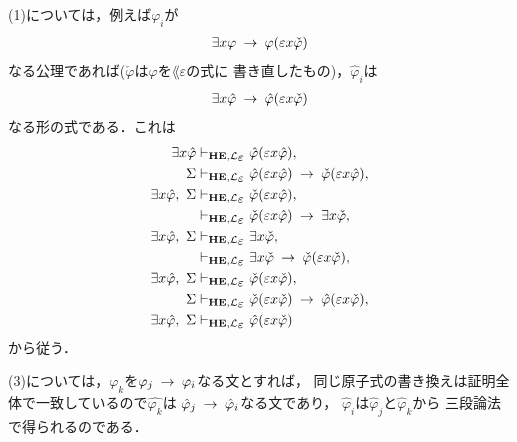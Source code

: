\begin{metaprf}
		(1)については，例えば$\varphi_{i}$が
		\begin{align}
			\exists x \varphi \hspace{0.25em}\rightarrow\hspace{0.25em} \varphi(\varepsilon x \check{\varphi})
		\end{align}
		なる公理であれば($\check{\varphi}$は$\varphi$を$\lang{\varepsilon}$の式に
		書き直したもの)，$\hat{\varphi}_{i}$は
		\begin{align}
			\exists x \hat{\varphi} \hspace{0.25em}\rightarrow\hspace{0.25em} \hat{\varphi}(\varepsilon x \check{\varphi})
		\end{align}
		なる形の式である．これは
		\begin{align}
			\exists x \hat{\varphi} &\provable{\mbox{{\bf HE}},\lang{\varepsilon}} \hat{\varphi}(\varepsilon x \hat{\varphi}), \\
			\Sigma &\provable{\mbox{{\bf HE}},\lang{\varepsilon}} \hat{\varphi}(\varepsilon x \hat{\varphi}) \rarrow \check{\varphi}(\varepsilon x \hat{\varphi}), \\
			\exists x \hat{\varphi},\ \Sigma &\provable{\mbox{{\bf HE}},\lang{\varepsilon}} \check{\varphi}(\varepsilon x \hat{\varphi}), \\
			&\provable{\mbox{{\bf HE}},\lang{\varepsilon}} \check{\varphi}(\varepsilon x \hat{\varphi}) \rarrow \exists x \check{\varphi}, \\
			\exists x \hat{\varphi},\ \Sigma &\provable{\mbox{{\bf HE}},\lang{\varepsilon}} \exists x \check{\varphi}, \\
			&\provable{\mbox{{\bf HE}},\lang{\varepsilon}} \exists x \check{\varphi} \rarrow \check{\varphi}(\varepsilon x \check{\varphi}), \\
			\exists x \hat{\varphi},\ \Sigma &\provable{\mbox{{\bf HE}},\lang{\varepsilon}} \check{\varphi}(\varepsilon x \check{\varphi}), \\
			\Sigma &\provable{\mbox{{\bf HE}},\lang{\varepsilon}} \check{\varphi}(\varepsilon x \check{\varphi}) \rarrow  \hat{\varphi}(\varepsilon x \check{\varphi}), \\
			\exists x \hat{\varphi},\ \Sigma &\provable{\mbox{{\bf HE}},\lang{\varepsilon}} \hat{\varphi}(\varepsilon x \check{\varphi})
		\end{align}
		から従う．
		
		(3)については，$\varphi_{k}$を$\varphi_{j} \hspace{0.25em}\rightarrow\hspace{0.25em} \varphi_{i}$なる文とすれば，
		同じ原子式の書き換えは証明全体で一致しているので$\hat{\varphi_{k}}$は
		$\hat{\varphi}_{j} \hspace{0.25em}\rightarrow\hspace{0.25em} \hat{\varphi}_{i}$なる文であり，
		$\hat{\varphi}_{i}$は$\hat{\varphi}_{j}$と$\hat{\varphi}_{k}$から
		三段論法で得られるのである．
		

\end{metaprf}
